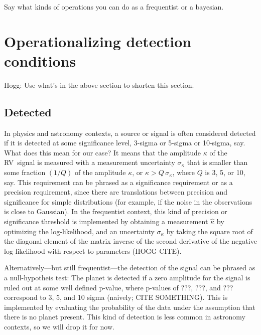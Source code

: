 \documentclass[modern]{aastex63}
\newcommand{\acronym}[1]{{\small{#1}}}
\newcommand{\rv}{\acronym{RV}}
\begin{document}
Say what kinds of operations you can do as a frequentist or a bayesian.

\section{Operationalizing detection conditions}

Hogg: Use what's in the above section to shorten this section.

\subsection{Detected}

In physics and astronomy contexts, a source or signal is often
considered detected if it is detected at some significance level,
3-sigma or 5-sigma or 10-sigma, say. What does this mean for our case?
It means that the amplitude $\kappa$ of the \rv\ signal is measured
with a measurement uncertainty $\sigma_\kappa$ that is smaller than
some fraction $(1/Q)$ of the amplitude $\kappa$, or $\kappa >
Q\,\sigma_\kappa$, where $Q$ is 3, 5, or 10, say.
This requirement can be phrased as a significance requirement or as a
precision requirement, since there are translations between precision
and significance for simple distributions (for example, if the noise
in the observations is close to Gaussian).
In the frequentist context, this kind of precision or significance
threshold is implemented by obtaining a measurement $\hat{\kappa}$ by
optimizing the log-likelihood, and an uncertainty $\sigma_\kappa$ by
taking the square root of the diagonal element of the matrix inverse
of the second derivative of the negative log likelihood with respect
to parameters (HOGG CITE).

Alternatively---but still frequentist---the detection of the signal
can be phrased as a null-hypotheis test: The planet is detected if a
zero amplitude for the signal is ruled out at some well defined
p-value, where p-values of ???, ???, and ??? correspond to 3, 5, and
10 sigma (naively; CITE SOMETHING).
This is implemented by evaluating the probability of the data under
the assumption that there is no planet present.
This kind of detection is less common in astronomy contexts, so we will
drop it for now.
\end{document}

